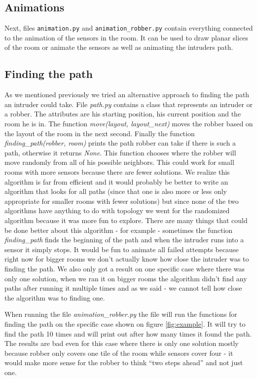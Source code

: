 \documentclass{article}
\begin{document}
\subsection*{Animations}

Next, files \texttt{animation.py} and \texttt{animation\_robber.py} contain everything connected to the animation of the sensors in the room. It can be used to draw planar slices of the room or animate the sensors as well as animating the intruders path. 

\subsection*{Finding the path}

As we mentioned previously we tried an alternative approach to finding the path an intruder could take. File \textit{path.py} contains a class that represents an intruder or a robber. The attributes are his starting position, his current position and the room he is in. The function \textit{move(layout, layout\_next)} moves the robber based on the layout of the room in the next second.  Finally the function \textit{finding\_path(robber, room)} prints the path robber can take if there is such a path, otherwise it returns \textit{None}. This function chooses where the robber will move randomly from all of his possible neighbors. This could work for small rooms with more sensors because there are fewer solutions. We realize this algorithm is far from efficient and it would probably be better to write an algorithm that looks for all paths (since that one is also more or less only appropriate for smaller rooms with fewer solutions) but since none of the two algorithms have anything to do with topology we went for the randomized algorithm because it was more fun to explore. There are many things that could be done better about this algorithm - for example - sometimes the function \textit{finding\_path} finds the beginning of the path and when the intruder runs into a sensor it simply stops. It would be fun to animate all failed attempts because right now for bigger rooms we don't actually know how close the intruder was to finding the path. We also only got a result on one specific case where there was only one solution, when we ran it on bigger rooms the algorithm didn't find any paths after running it multiple times and as we said - we cannot tell how close the algorithm was to finding one.

When running the file \textit{animation\_robber.py} the file will run the functions for finding the path on the specific case shown on figure \ref{fig:example}. It will try to find the path 10 times and will print out after how many times it found the path. The results are bad even for this case where there is only one solution mostly because robber only covers one tile of the room while sensors cover four - it would make more sense for the robber to think ``two steps ahead'' and not just one.
\end{document}
